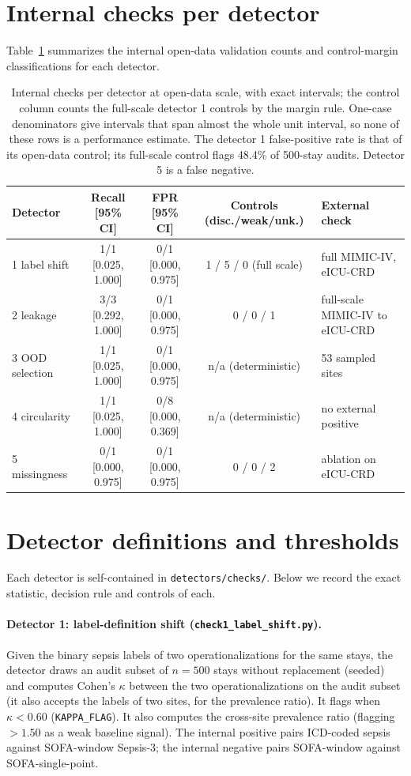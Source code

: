 \documentclass[10pt]{article}
\theoremstyle{definition}
\begin{document}
\section{Internal checks per detector}
\label{apd:depth}
Table~\ref{tab:depth} summarizes the internal open-data validation counts and control-margin classifications for each detector.
\begin{table}[h]
\centering\footnotesize\setlength{\tabcolsep}{3pt}
\begin{tabular}{@{}lcccp{2.6cm}@{}}
\toprule
Detector & Recall [95\% CI] & FPR [95\% CI] & Controls (disc./weak/unk.) & External check\\
\midrule
1 label shift & 1/1 [0.025, 1.000] & 0/1 [0.000, 0.975] & 1 / 5 / 0 (full scale) & full MIMIC-IV, eICU-CRD\\
2 leakage & 3/3 [0.292, 1.000] & 0/1 [0.000, 0.975] & 0 / 0 / 1 & full-scale MIMIC-IV to eICU-CRD\\
3 OOD selection & 1/1 [0.025, 1.000] & 0/1 [0.000, 0.975] & n/a (deterministic) & 53 sampled sites\\
4 circularity & 1/1 [0.025, 1.000] & 0/8 [0.000, 0.369] & n/a (deterministic) & no external positive\\
5 missingness & 0/1 [0.000, 0.975] & 0/1 [0.000, 0.975] & 0 / 0 / 2 & ablation on eICU-CRD\\
\bottomrule
\end{tabular}
\caption{Internal checks per detector at open-data scale, with exact intervals; the control column counts the full-scale detector 1 controls by the margin rule. One-case denominators give intervals that span almost the whole unit interval, so none of these rows is a performance estimate. The detector 1 false-positive rate is that of its open-data control; its full-scale control flags 48.4\% of 500-stay audits. Detector 5 is a false negative.}
\label{tab:depth}
\end{table}
\FloatBarrier

\section{Detector definitions and thresholds}
\label{apd:detectors}
Each detector is self-contained in \texttt{detectors/checks/}. Below we record the exact statistic, decision rule and controls of each.

\paragraph{Detector 1: label-definition shift (\texttt{check1\_label\_shift.py}).}
Given the binary sepsis labels of two operationalizations for the same stays, the detector draws an audit subset of $n=500$ stays without replacement (seeded) and computes Cohen's $\kappa$ between the two operationalizations on the audit subset (it also accepts the labels of two sites, for the prevalence ratio). It flags when $\kappa < 0.60$ (\texttt{KAPPA\_FLAG}). It also computes the cross-site prevalence ratio (flagging $>1.50$ as a weak baseline signal). The internal positive pairs ICD-coded sepsis against SOFA-window Sepsis-3; the internal negative pairs SOFA-window against SOFA-single-point.
\end{document}
